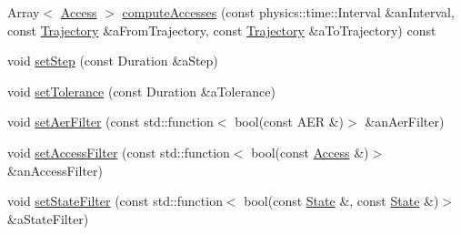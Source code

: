 \begin{DoxyCompactItemize}
\item 
Array$<$ \hyperlink{classostk_1_1astro_1_1_access}{Access} $>$ \hyperlink{classostk_1_1astro_1_1access_1_1_generator_a3624c39c3ffa4588c40a687ccc4b8145}{compute\+Accesses} (const physics\+::time\+::\+Interval \&an\+Interval, const \hyperlink{classostk_1_1astro_1_1_trajectory}{Trajectory} \&a\+From\+Trajectory, const \hyperlink{classostk_1_1astro_1_1_trajectory}{Trajectory} \&a\+To\+Trajectory) const
\item 
void \hyperlink{classostk_1_1astro_1_1access_1_1_generator_a4c0cb8f1e59364029e88078c423cd96b}{set\+Step} (const Duration \&a\+Step)
\item 
void \hyperlink{classostk_1_1astro_1_1access_1_1_generator_a9590a1ebb05d28f7934f8ccafbd02a60}{set\+Tolerance} (const Duration \&a\+Tolerance)
\item 
void \hyperlink{classostk_1_1astro_1_1access_1_1_generator_a4d82f15eb2da1fbf7c74b3136eed3301}{set\+Aer\+Filter} (const std\+::function$<$ bool(const A\+ER \&)$>$ \&an\+Aer\+Filter)
\item 
void \hyperlink{classostk_1_1astro_1_1access_1_1_generator_ade3c6b8b5afe0f850e3531d715eac826}{set\+Access\+Filter} (const std\+::function$<$ bool(const \hyperlink{classostk_1_1astro_1_1_access}{Access} \&)$>$ \&an\+Access\+Filter)
\item 
void \hyperlink{classostk_1_1astro_1_1access_1_1_generator_a2e67d180ec17450e460be15f24a1d84d}{set\+State\+Filter} (const std\+::function$<$ bool(const \hyperlink{classostk_1_1astro_1_1trajectory_1_1_state}{State} \&, const \hyperlink{classostk_1_1astro_1_1trajectory_1_1_state}{State} \&)$>$ \&a\+State\+Filter)
\end{DoxyCompactItemize}
